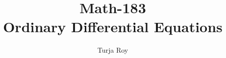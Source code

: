 

\title{
    \textbf{Math-183} \\
    \textbf{Ordinary Differential Equations}
}

\author{
    Turja Roy \\
}
\date{}


\maketitle

\tableofcontents
\newpage







